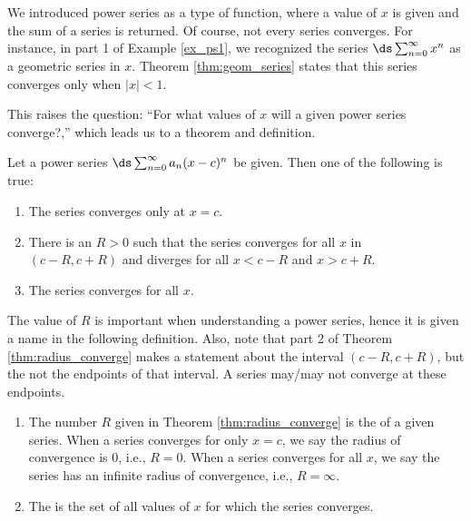 We introduced power series as a type of function, where a value of $x$ is given and the sum of a series is returned. Of course, not every series converges. For instance, in part 1 of Example \ref{ex_ps1}, we recognized the series $\ds \sum_{n=0}^\infty x^n$ as a geometric series in $x$. Theorem \ref{thm:geom_series} states that this series converges only when $|x|<1$. 

This raises the question: ``For what values of $x$ will a given power series converge?,'' which  leads us to a theorem and definition.

{Let a power series $\ds \sum_{n=0}^\infty a_n(x-c)^n$ be given. Then one of the following is true:
\begin{enumerate}
	\item The series converges only at $x=c$.
	\item	There is an $R>0$ such that the series converges for all $x$ in \\	
	$(c-R,c+R)$ and diverges for all $x<c-R$ and $x>c+R$.
	\item	The series converges for all $x$.
\end{enumerate}
}

	
	The value of $R$ is important when understanding a power series, hence it is given a name in the following definition. Also, note that part 2 of Theorem \ref{thm:radius_converge} makes a statement about the interval $(c-R,c+R)$, but the not the endpoints of that interval. A series may/may not converge at these endpoints.
	
	{  \begin{enumerate}
		\item The number $R$ given in Theorem \ref{thm:radius_converge} is the  of a given series. When a series converges for only $x=c$, we say the radius of convergence is 0, i.e.,  $R=0$. When a series converges for all $x$, we say the series has an infinite radius of convergence, i.e., $R=\infty$.
			\item	The  is the set of all values of $x$ for which the series converges.
	\end{enumerate}
	}

